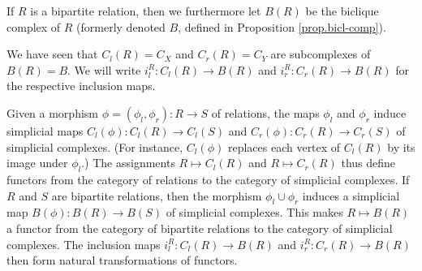 \documentclass[numbers=enddot,12pt,final,onecolumn,notitlepage]{scrartcl}%
\theoremstyle{definition}
\begin{document}
If $R$ is a bipartite relation, then we furthermore let $B(R)$ be the
biclique complex of $R$ (formerly denoted $B$,
defined in Proposition \ref{prop.bicl-comp}).

We have seen that $C_l(R) = C_X$ and $C_r(R) = C_Y$ are subcomplexes of $B(R) = B$.
We will write $i_l^R \colon C_l(R) \to B(R)$ and $i_r^R \colon C_r(R) \to B(R)$
for the respective inclusion maps.

Given a morphism $\phi = (\phi_l, \phi_r)\colon R \to S$ of relations, the maps $\phi_l$ and $\phi_r$ induce
simplicial maps $C_l(\phi) \colon C_l(R) \to C_l(S)$ and $C_r(\phi) \colon C_r(R) \to C_r(S)$
of simplicial complexes.
(For instance, $C_l(\phi)$ replaces each vertex of $C_l(R)$ by its image under $\phi_l$.)
The assignments $R \mapsto C_l(R)$ and $R \mapsto C_r(R)$
thus define functors from the category of relations to the category of simplicial complexes.
If $R$ and $S$ are bipartite relations, then the morphism $\phi_l \cup \phi_r$ induces a
simplicial map $B(\phi) \colon B(R) \to B(S)$ of simplicial complexes.
This makes $R \mapsto B(R)$ a functor from the category of bipartite relations to the category
of simplicial complexes.
The inclusion maps $i_l^R \colon C_l(R) \to B(R)$ and $i_r^R \colon C_r(R) \to B(R)$
then form natural transformations of functors.

\end{document}
